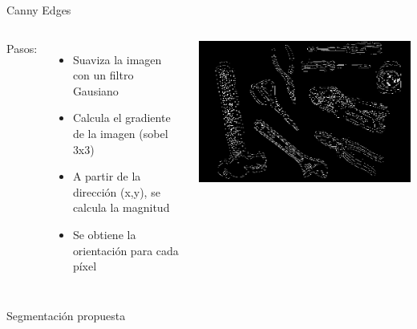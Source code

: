 \documentclass[
  24pt, %
]{beamer}
\begin{document}
\begin{frame}{Canny Edges}
  \begin{columns}
    Pasos:
    \begin{itemize}
    \item Suaviza la imagen con un filtro Gausiano
    \item Calcula el gradiente de la imagen (sobel 3x3)
    \item A partir de la dirección (x,y), se calcula la magnitud
    \item Se obtiene la orientación para cada píxel
    \end{itemize}
    \includegraphics[width=\textwidth]{canny}
  \end{columns}
\end{frame}

\begin{frame}{Segmentación propuesta}

  \centering
    
\end{frame}
\end{document}
